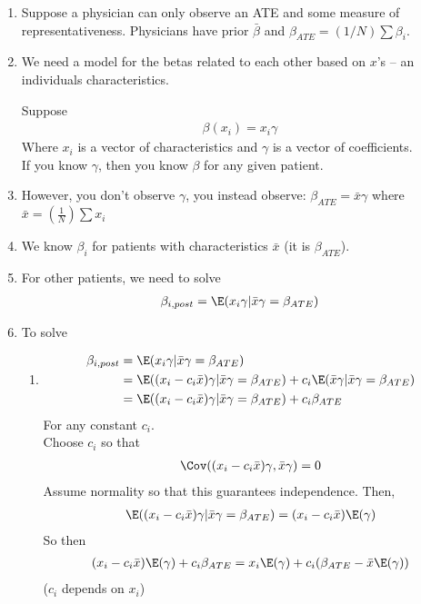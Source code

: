 \begin{enumerate}

	\item  Suppose a physician can only observe an ATE and some measure of representativeness. Physicians have prior
		$\bar{\beta}$ and  $\beta_{ATE} = (1/N) \sum \beta_{i}$.

	\item We need a model for the betas related to each other based on $x$'s -- an individuals characteristics.

		Suppose
		\begin{align*}
			\beta(x_i) = x_i \gamma
		\end{align*} 
		Where $x_i$ is a vector of characteristics and $\gamma$ is a vector of coefficients. \\
		If you know $\gamma$, then you know $\beta$ for any given patient.
	\item However, you don't observe $\gamma$, you instead observe:
		$\beta_{ATE} = \bar x \gamma$ where $\bar x = (\frac{1}{N}) \sum x_i$
	\item We know $\beta_i$ for patients with characteristics $\bar x$ (it is $\beta_{ATE}$).
	\item For other patients, we need to solve
		\begin{align*}
			\beta_{i,post} = \E(x_i \gamma | \bar x \gamma = \beta_{ATE})
		\end{align*} 

	\item To solve
		\begin{enumerate}
			\item
				\begin{align*}
					\beta_{i,post} & = \E (x_i \gamma | \bar x \gamma = \beta_{ATE})                                                                        \\
								   & = \E((x_i - c_i \bar{x}) \gamma | \bar{x} \gamma = \beta_{ATE}) + c_i \E(\bar{x} \gamma | \bar{x} \gamma = \beta_{ATE}) \\
								   & = \E((x_{i} - c_i \bar{x}) \gamma | \bar{x} \gamma = \beta_{ATE}) + c_i \beta_{ATE}                                       \\
				\end{align*}
				For any constant $c_i$. \\
				Choose $c_i$ so that 
				\begin{align*}
					\Cov((x_{i} - c_i \bar{x})\gamma, \bar{x} \gamma) = 0
				\end{align*} 
				Assume normality so that this guarantees independence.
				Then,
				\begin{align*}
					\E((x_i - c_i \bar{x}) \gamma | \bar{x} \gamma = \beta_{ATE}) = (x_{i} - c_i \bar{x}) \E(\gamma)
				\end{align*}
				So then
				\begin{align*}
					(x_i - c_i \bar{x}) \E(\gamma) + c_i \beta_{ATE} = x_i \E(\gamma) + c_i (\beta_{ATE} - \bar{x} \E(\gamma))
				\end{align*} 
				($c_i$ depends on $x_i$)


\end{enumerate}
\end{enumerate}
